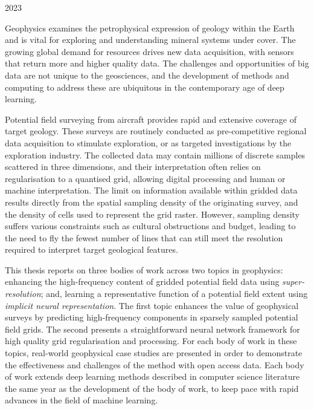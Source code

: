 \documentclass[12pt,a4paper,notitlepage]{report} %
\begin{document}
\begin{titlepage}
    \vspace*{\fill}
    2023
\end{titlepage}


\setcounter{page}{1}

Geophysics examines the petrophysical expression of geology within the Earth and is vital for exploring and understanding mineral systems under cover.
The growing global demand for resources drives new data acquisition, with sensors that return more and higher quality data.
The challenges and opportunities of big data are not unique to the geosciences, and the development of methods and computing to address these are ubiquitous in the contemporary age of deep learning.

Potential field surveying from aircraft provides rapid and extensive coverage of target geology.
These surveys are routinely conducted as pre-competitive regional data acquisition to stimulate exploration, or as targeted investigations by the exploration industry.
The collected data may contain millions of discrete samples scattered in three dimensions, and their interpretation often relies on regularisation to a quantised grid, allowing digital processing and human or machine interpretation.
The limit on information available within gridded data results directly from the spatial sampling density of the originating survey, and the density of cells used to represent the grid raster.
However, sampling density suffers various constraints such as cultural obstructions and budget, leading to the need to fly the fewest number of lines that can still meet the resolution required to interpret target geological features.

This thesis reports on three bodies of work across two topics in geophysics: enhancing the high-frequency content of gridded potential field data using \emph{super-resolution}; and, learning a representative function of a potential field extent using \emph{implicit neural representation}.
The first topic enhances the value of geophysical surveys by predicting high-frequency components in sparsely sampled potential field grids.
The second presents a straightforward neural network framework for high quality grid regularisation and processing.
For each body of work in these topics, real-world geophysical case studies are presented in order to demonstrate the effectiveness and challenges of the method with open access data.
Each body of work extends deep learning methods described in computer science literature the same year as the development of the body of work, to keep pace with rapid advances in the field of machine learning.
\end{document}
